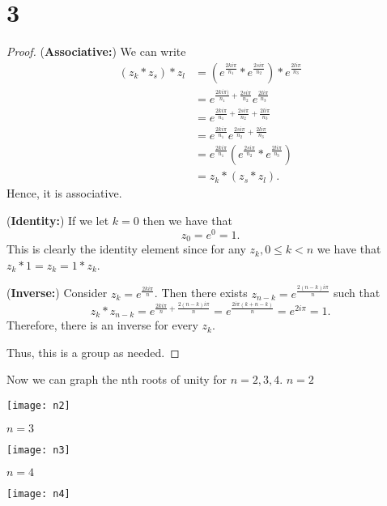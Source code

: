 \documentclass{article}
\begin{document}
\section*{3}
\begin{proof}
    (\textbf{Associative:}) We can write
    \begin{align*}
        (z_k * z_s) * z_l & = (e^{\frac{2ki\pi }{n_1}} * e^{\frac{2si\pi }{n_2}})
        *e^{\frac{2li\pi }{n_3}}                                                                          \\
                          & = e^{\frac{2ki\pi)}{n_1} + \frac{2si\pi}{n_2}} e^{\frac{2li\pi }{n_3}}        \\
                          & = e^{\frac{2ki\pi}{n_1}+\frac{2si\pi}{n_2}+\frac{2li\pi}{n_3}}                \\
                          & =e^{\frac{2ki\pi }{n_1}} e^{\frac{2si\pi}{n_2} + \frac{2li\pi}{n_3}}          \\
                          & = e^{\frac{2ki\pi }{n_1}} (e^{\frac{2si\pi }{n_2}} * e^{\frac{2li\pi }{n_3}}) \\
                          & = z_k*(z_s*z_l).
    \end{align*}
    Hence, it is associative.

    (\textbf{Identity:}) If we let $k = 0$ then we have that
    \begin{equation*}
        z_0 = e^0 = 1.
    \end{equation*}
    This is clearly the identity element since for any $z_k, 0 \leq k < n$ we have that
    $z_k * 1 = z_k = 1 * z_k$.

    (\textbf{Inverse:}) Consider $z_k = e^{\frac{2ki\pi }{n}}$. Then there exists
    $z_{n-k} = e^{\frac{2(n-k)i \pi }{n}}$ such that
    \begin{equation*}
        z_k*z_{n-k} = e^{\frac{2ki\pi }{n} + \frac{2(n-k)i\pi }{n}}
        = e^{\frac{2i\pi(k + n - k)}{n}} = e^{2i\pi} = 1.
    \end{equation*}
    Therefore, there is an inverse for every $z_k$.

    Thus, this is a group as needed.
\end{proof}

Now we can graph the nth roots of unity for $n = 2,3,4$.
$n=2$

\texttt{[image: n2]}

$n=3$

\texttt{[image: n3]}

$n=4$

\texttt{[image: n4]}
\end{document}

